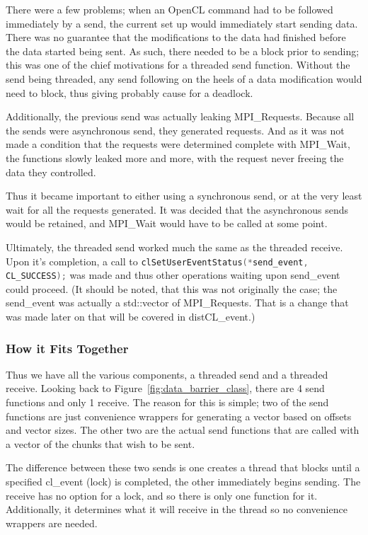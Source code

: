 \documentclass[thesis.tex]{subfiles}
\begin{document}
    There were a few problems; when an OpenCL command had to be followed immediately by a send, the current set up would immediately start sending data. There was no guarantee that the modifications to the data had finished before the data started being sent. As such, there needed to be a block prior to sending; this was one of the chief motivations for a threaded send function. Without the send being threaded, any send following on the heels of a data modification would need to block, thus giving probably cause for a deadlock.

    Additionally, the previous send was actually leaking MPI\_Requests\cite{leakingmpi}. Because all the sends were asynchronous send, they generated requests. And as it was not made a condition that the requests were determined complete with MPI\_Wait, the functions slowly leaked more and more, with the request never freeing the data they controlled.

    Thus it became important to either using a synchronous send, or at the very least wait for all the requests generated. It was decided that the asynchronous sends would be retained, and MPI\_Wait would have to be called at some point.

    Ultimately, the threaded send worked much the same as the threaded receive. Upon it's completion, a call to \lstinline[language=cpp]{clSetUserEventStatus(*send_event, CL_SUCCESS);} was made and thus other operations waiting upon send\_event could proceed. (It should be noted, that this was not originally the case; the send\_event was actually a std::vector of MPI\_Requests. That is a change that was made later on that will be covered in distCL\_event.)

  \subsubsection{How it Fits Together} %
  \label{ssub:how_it_fits_together}
    Thus we have all the various components, a threaded send and a threaded receive. Looking back to Figure~\ref{fig:data_barrier_class}, there are 4 send functions and only 1 receive. The reason for this is simple; two of the send functions are just convenience wrappers for generating a vector based on offsets and vector sizes. The other two are the actual send functions that are called with a vector of the chunks that wish to be sent.

    The difference between these two sends is one creates a thread that blocks until a specified cl\_event (lock) is completed, the other immediately begins sending. The receive has no option for a lock, and so there is only one function for it. Additionally, it determines what it will receive in the thread so no convenience wrappers are needed.
\end{document}
